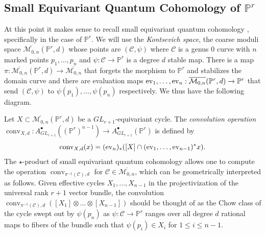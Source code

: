 \documentclass[12pt]{amsart}
\newcommand{\mb}{\mathbb}
\newcommand{\mc}{\mathcal}
\newcommand{\ol}{\overline}
\newcommand{\ev}{{\rm ev}}
\newcommand{\MM}{{\mathcal M}}
\newcommand{\conv}{{\operatorname{conv}}}
\theoremstyle{plain}
\theoremstyle{definition}
\newtheorem{Rem}[Thm]{Remark}
\theoremstyle{remark}
\begin{document}

\subsection{Small Equivariant Quantum Cohomology of $\mb{P}^r$}
At this point it makes sense to recall small equivariant quantum cohomology \cite{Kim93}, specifically in the case of $\mb{P}^r$. We will use the \emph{Kontsevich space}, the coarse moduli space $\ol{\MM_{0,n}}(\mb{P}^r,d)$ whose points are $(\mc{C}, \psi)$ where $\mc{C}$ is a genus $0$ curve with $n$ marked points $p_1, \ldots, p_n$ and $\psi : \mc{C} \to \mb{P}^r$ is a degree $d$ stable map. There is a map $\pi : \ol{\mc{M}_{0,n}}(\mb{P}^r,d) \to \ol{\mc{M}_{0, n}}$ that forgets the morphism to $\mb{P}^r$ and stabilizes the domain curve and there are evaluation maps $\ev_1, \ldots, \ev_n : \ol{\mc{M}_{0,n}}(\mb{P}^r,d) \to \mb{P}^r$ that send $(\mc{C}, \psi)$ to $\psi(p_1), \ldots, \psi(p_n)$ respectively. We thus have the following diagram.
\begin{center}
\end{center}
Let $X \subset \overline{\MM_{0,n}}(\mb{P}^r,d)$ be a $GL_{r+1}$-equivariant cycle. The \emph{convolution operation} $\operatorname{conv}_{X,d}:A^\bullet_{GL_{r+1}}((\mb{P}^r)^{n-1})\to A^\bullet_{GL_{r+1}}(\mb{P}^r)$ is defined by \[\conv_{X,d}(x) = (\ev_n)_*([X] \cap(\ev_{1}, \ldots, \ev_{n-1})^* x).\] 
The $\star$-product of small equivariant quantum cohomology allows one to compute the operation $\conv_{\pi^{-1}(\mc{C}),d}$ for $\mc{C} \in \ol{\MM_{0, n}}$, which can be geometrically interpreted as follows. Given effective cycles $X_1, \ldots, X_{n-1}$ in the projectivization of the universal rank $r+1$ vector bundle, the convolution $\conv_{\pi^{-1}(\mc{C}),d}([X_1] \otimes \ldots \otimes [X_{n-1}])$ should be thought of as the Chow class of the cycle swept out by $\psi(p_n)$ as $\psi: \mc{C} \to \mb{P}^r$ ranges over all degree $d$ rational maps to fibers of the bundle such that $\psi(p_i) \in X_i$ for $1 \leq i \leq n-1$.
\end{document}
